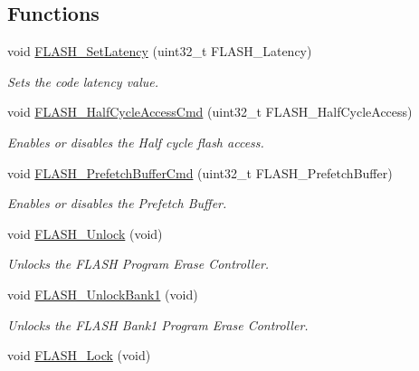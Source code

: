 \subsection*{Functions}
\begin{DoxyCompactItemize}
\item 
void \hyperlink{group___f_l_a_s_h___private___functions_ga54bcb96270215c752c3479c8c9e438c0}{F\+L\+A\+S\+H\+\_\+\+Set\+Latency} (uint32\+\_\+t F\+L\+A\+S\+H\+\_\+\+Latency)
\begin{DoxyCompactList}\small\item\em Sets the code latency value. \end{DoxyCompactList}\item 
void \hyperlink{group___f_l_a_s_h___private___functions_ga978103a57b37920ac01128e999f9ece6}{F\+L\+A\+S\+H\+\_\+\+Half\+Cycle\+Access\+Cmd} (uint32\+\_\+t F\+L\+A\+S\+H\+\_\+\+Half\+Cycle\+Access)
\begin{DoxyCompactList}\small\item\em Enables or disables the Half cycle flash access. \end{DoxyCompactList}\item 
void \hyperlink{group___f_l_a_s_h___private___functions_ga6b93faaf0f560bf8d662b2cefe2f70e8}{F\+L\+A\+S\+H\+\_\+\+Prefetch\+Buffer\+Cmd} (uint32\+\_\+t F\+L\+A\+S\+H\+\_\+\+Prefetch\+Buffer)
\begin{DoxyCompactList}\small\item\em Enables or disables the Prefetch Buffer. \end{DoxyCompactList}\item 
void \hyperlink{group___f_l_a_s_h___private___functions_ga4084d0184bab463a1579271bf474aaef}{F\+L\+A\+S\+H\+\_\+\+Unlock} (void)
\begin{DoxyCompactList}\small\item\em Unlocks the F\+L\+A\+SH Program Erase Controller. \end{DoxyCompactList}\item 
void \hyperlink{group___f_l_a_s_h___private___functions_ga358c4b7e0ef20693ca62cc9d20c94a5a}{F\+L\+A\+S\+H\+\_\+\+Unlock\+Bank1} (void)
\begin{DoxyCompactList}\small\item\em Unlocks the F\+L\+A\+SH Bank1 Program Erase Controller. \end{DoxyCompactList}\item 
void \hyperlink{group___f_l_a_s_h___private___functions_ga46899557353c4312ddbe3f25e65df1d8}{F\+L\+A\+S\+H\+\_\+\+Lock} (void)

\end{DoxyCompactItemize}
